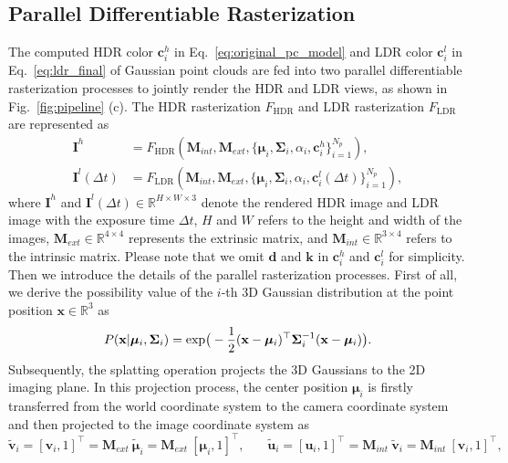 \documentclass{article}
\begin{document}
\subsection{Parallel Differentiable Rasterization}
The computed HDR color $\bm{c}_i^h$ in Eq.~\eqref{eq:original_pc_model} and LDR color $\bm{c}_i^l$ in Eq.~\eqref{eq:ldr_final} of Gaussian point clouds are fed into two parallel differentiable rasterization processes to jointly render the HDR and LDR views, as shown in Fig.~\ref{fig:pipeline} (c). The HDR rasterization $F_{\text{HDR}}$ and LDR rasterization $F_{\text{LDR}}$ are represented as
\begin{equation}
\begin{aligned}
    \mathbf{I}^{h} &= F_{\text{HDR}}(\mathbf{M}_{int}, \mathbf{M}_{ext}, \{\bm{\mu}_i, \mathbf{\Sigma}_i, \alpha_i, \bm{c}_i^h\}_{i=1}^{N_p}), \\
    \mathbf{I}^{l}(\Delta t) &= F_{\text{LDR}}(\mathbf{M}_{int}, \mathbf{M}_{ext}, \{\bm{\mu}_i, \mathbf{\Sigma}_i, \alpha_i, \bm{c}_i^l(\Delta t)\}_{i=1}^{N_p}),
\end{aligned}
 \label{eq:pdr}
\end{equation}
where $\mathbf{I}^{h}$ and $\mathbf{I}^{l} (\Delta t) \in \mathbb{R}^{H\times W\times3}$ denote the rendered HDR image and LDR image with the exposure time $\Delta t$, $H$ and $W$ refers to the height and width of the images, $\mathbf{M}_{ext} \in \mathbb{R}^{4\times 4}$ represents the extrinsic matrix, and $\mathbf{M}_{int} \in \mathbb{R}^{3\times 4}$ refers to the intrinsic matrix. Please note that we omit $\mathbf{d}$ and $\mathbf{k}$ in $\bm{c}_i^h$ and $\bm{c}_i^l$ for simplicity. Then we introduce the details of the parallel rasterization processes. First of all, we derive the possibility value of the $i$-th 3D Gaussian distribution at the point position $\mathbf{x} \in \mathbb{R}^3$ as
\begin{equation}
	P(\mathbf{x}|\mathrm{\bm{\mu}}_i, \mathrm{\bf \Sigma}_i) = \text{exp}\big(-\frac{1}{2}(\mathbf{x} - \bm{\mu}_i)^\top \mathrm{\bf \Sigma}_i^{-1} (\mathbf{x} - \bm{\mu}_i)\big).
\end{equation}
Subsequently, the splatting operation projects the 3D Gaussians to the 2D imaging plane. In this projection process, the center position $\bm{\mu}_i$ is firstly transferred from the world coordinate system to the camera coordinate system and then projected to the image coordinate system as
\begin{equation}
    \widetilde{\mathbf{v}}_i = [\mathbf{v}_{i}, 1]^{\top}
	 = \mathbf{M}_{ext}~ \widetilde{\bm{\mu}}_i = \mathbf{M}_{ext}~[\bm{\mu}_{i}, 1]^{\top},~~~~~~~~
        \widetilde{\mathbf{u}}_i = [\mathbf{u}_{i}, 1]^{\top}
 = \mathbf{M}_{int}~ \widetilde{\mathbf{v}}_i = \mathbf{M}_{int}~[\mathbf{v}_{i}, 1]^{\top},
\end{equation}
\end{document}
